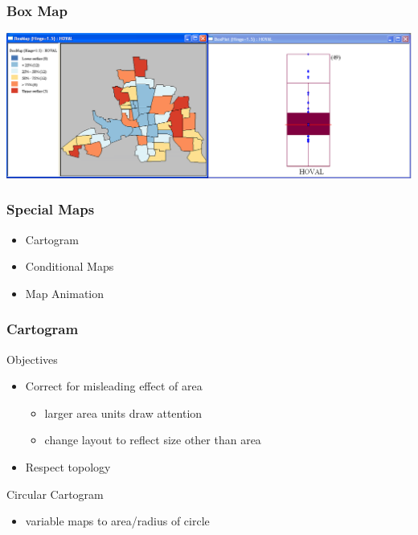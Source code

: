 \documentclass[nototal,handout]{beamer}
\begin{document}
\begin{frame}
	\frametitle{Box Map}
 \begin{center}
 \includegraphics[width=.85\linewidth]{boxmapgeoda.png}
  \end{center}
 \end{frame} 

\begin{frame}
	\frametitle{Special Maps}
 \begin{itemize}
 \item  Cartogram
 \item  Conditional Maps
 \item  Map Animation
 \end{itemize}
 \end{frame} 

\begin{frame}
	\frametitle{Cartogram}
 
\begin{block}{Objectives}
 \begin{itemize}
 \item  Correct for  misleading effect of area
 \begin{itemize}
 \item  larger area units  draw attention
 \item  change layout to reflect size other than area
 \end{itemize}
 \item  Respect topology
 \end{itemize}
 \end{block} 
\begin{block}{Circular Cartogram}
 \begin{itemize}
 \item  variable maps to area/radius of circle
 \end{itemize}
 \end{block} \end{frame} 
\end{document}
